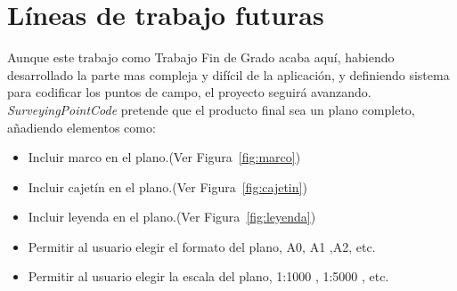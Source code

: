 \section{Líneas de trabajo futuras}

Aunque este trabajo como Trabajo Fin de Grado acaba aquí, habiendo desarrollado la parte mas compleja y difícil de la aplicación, y definiendo sistema para codificar los puntos de campo, el proyecto seguirá avanzando. \emph{SurveyingPointCode} pretende que el producto final sea un plano completo, añadiendo elementos como:



\begin{itemize}
\item Incluir marco en el plano.(Ver Figura~\ref{fig:marco})
\item Incluir cajetín en el plano.(Ver Figura~\ref{fig:cajetin})
\item Incluir leyenda en el plano.(Ver Figura~\ref{fig:leyenda})
\item Permitir al usuario elegir el formato del plano, A0, A1 ,A2, etc.
\item Permitir al usuario elegir la escala del plano, 1:1000 , 1:5000 , etc.
\end{itemize}

